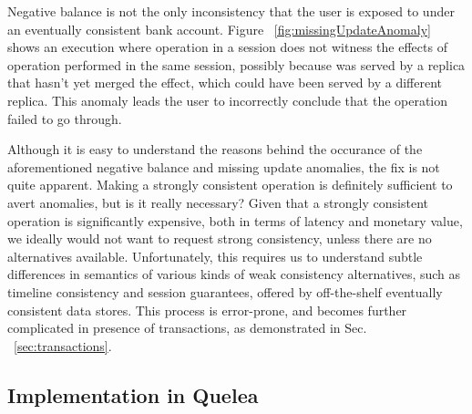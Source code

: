 Negative balance is not the only inconsistency that the user is
exposed to under an eventually consistent bank account. Figure
~\ref{fig:missingUpdateAnomaly} shows an execution where
 operation in a session does not witness the effects of
 operation performed in the same session, possibly
because  was served by a replica that hasn't yet merged
the  effect, which could have been served by a different
replica. This anomaly leads the user to incorrectly conclude that the
 operation failed to go through.

Although it is easy to understand the reasons behind the occurance of
the aforementioned negative balance and missing update anomalies, the
fix is not quite apparent. Making  a strongly
consistent operation is definitely sufficient to avert anomalies, but
is it really necessary? Given that a strongly consistent operation is
significantly expensive, both in terms of latency and monetary value, we ideally
would not want to request strong consistency, unless there are
no alternatives available. Unfortunately, this requires us to
understand subtle differences in semantics of various kinds of weak
consistency alternatives, such as timeline consistency and session
guarantees, offered by off-the-shelf eventually consistent data
stores. This process is error-prone, and becomes further complicated
in presence of transactions, as demonstrated in Sec.
~\ref{sec:transactions}.


\subsection{Implementation in Quelea}

